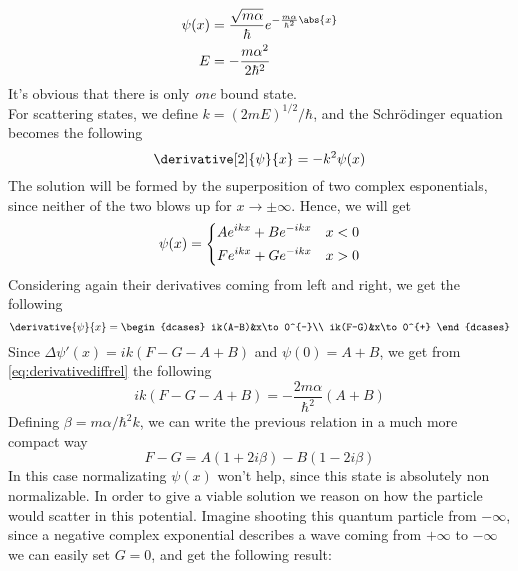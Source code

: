 \documentclass[a4paper, 11pt]{book}
\newcommand{\1}{\opr{\mathds{1}}}
\theoremstyle{plain}
\begin{document}
	\begin{equation}
		\begin{aligned}
			\psi(x)&=\frac{\sqrt{m\alpha}}{\hbar}e^{-\frac{m\alpha}{\hbar^2}\abs{x}}\\
			E&=-\frac{m\alpha^2}{2\hbar^2}
		\end{aligned}
		\label{eq:boundstatesdeltae}
	\end{equation}
	It's obvious that there is only \emph{one} bound state.\\
	For scattering states, we define $k=(2mE)^{1/2}/\hbar$, and the Schrödinger equation becomes the following
	\begin{equation}
		\derivative[2]{\psi}{x}=-k^2\psi(x)
		\label{eq:scatteringstateshamdelta}
	\end{equation}
	The solution will be formed by the superposition of two complex esponentials, since neither of the two blows up for $x\to\pm\infty$. Hence, we will get
	\begin{equation}
		\psi(x)=\begin{dcases}
			Ae^{ikx}+Be^{-ikx}&x<0\\
			Fe^{ikx}+Ge^{-ikx}&x>0
		\end{dcases}
		\label{eq:solution}
	\end{equation}
	Considering again their derivatives coming from left and right, we get the following
	\begin{equation}
		\derivative{\psi}{x}=\begin{dcases}
			ik(A-B)&x\to0^{-}\\
			ik(F-G)&x\to0^{+}
		\end{dcases}
		\label{eq:derivativecond}
	\end{equation}
	Since $\Delta\psi'(x)=ik(F-G-A+B)$ and $\psi(0)=A+B$, we get from \eqref{eq:derivativediffrel} the following
	\begin{equation*}
		ik\left( F-G-A+B \right)=-\frac{2m\alpha}{\hbar^2}\left( A+B \right)
	\end{equation*}
	Defining $\beta=m\alpha/\hbar^2k$, we can write the previous relation in a much more compact way
	\begin{equation}
		F-G=A(1+2i\beta)-B(1-2i\beta)
		\label{eq:coeffcondscattering}
	\end{equation}
	In this case normalizating $\psi(x)$ won't help, since this state is absolutely non normalizable. In order to give a viable solution we reason on how the particle would scatter in this potential. Imagine shooting this quantum particle from $-\infty$, since a negative complex exponential describes a wave coming from $+\infty$ to $-\infty$ we can easily set $G=0$, and get the following result:
\end{document}

